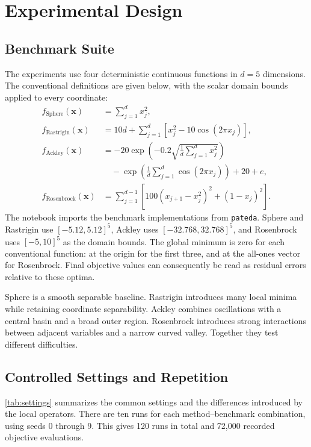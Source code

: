 \section{Experimental Design}

\subsection{Benchmark Suite}

The experiments use four deterministic continuous functions in $d=5$ dimensions. The conventional definitions are given below, with the scalar domain bounds applied to every coordinate:
\begin{align}
 f_{\mathrm{Sphere}}(\mathbf{x})&=\sum_{j=1}^{d}x_j^2,\\
 f_{\mathrm{Rastrigin}}(\mathbf{x})&=10d+\sum_{j=1}^{d}\left[x_j^2-10\cos(2\pi x_j)\right],\\
 f_{\mathrm{Ackley}}(\mathbf{x})&=-20\exp\!\left(-0.2\sqrt{\frac{1}{d}\sum_{j=1}^{d}x_j^2}\right)\nonumber\\
 &\quad-\exp\!\left(\frac{1}{d}\sum_{j=1}^{d}\cos(2\pi x_j)\right)+20+e,\\
 f_{\mathrm{Rosenbrock}}(\mathbf{x})&=\sum_{j=1}^{d-1}\left[100(x_{j+1}-x_j^2)^2+(1-x_j)^2\right].
\end{align}
The notebook imports the benchmark implementations from \texttt{pateda}. Sphere and Rastrigin use $[-5.12,5.12]^5$, Ackley uses $[-32.768,32.768]^5$, and Rosenbrock uses $[-5,10]^5$ as the domain bounds. The global minimum is zero for each conventional function: at the origin for the first three, and at the all-ones vector for Rosenbrock. Final objective values can consequently be read as residual errors relative to these optima.

Sphere is a smooth separable baseline. Rastrigin introduces many local minima while retaining coordinate separability. Ackley combines oscillations with a central basin and a broad outer region. Rosenbrock introduces strong interactions between adjacent variables and a narrow curved valley. Together they test different difficulties.

\subsection{Controlled Settings and Repetition}

\autoref{tab:settings} summarizes the common settings and the differences introduced by the local operators. There are ten runs for each method--benchmark combination, using seeds 0 through 9. This gives 120 runs in total and 72,000 recorded objective evaluations. 

